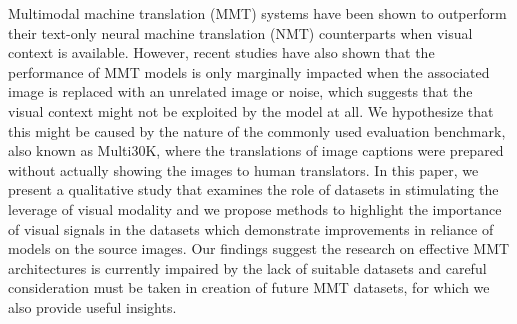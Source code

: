 Multimodal machine translation (MMT) systems have been shown to outperform their text-only neural machine translation (NMT) counterparts when visual context is available. However, recent studies have also shown that the performance of MMT models is only marginally impacted when the associated image is replaced with an unrelated image or noise, which suggests that the visual context might not be exploited by the model at all. We hypothesize that this might be caused by the nature of the commonly used evaluation benchmark, also known as Multi30K, where the translations of image captions were prepared without actually showing the images to human translators. In this paper, we present a qualitative study that examines the role of datasets in stimulating the leverage of visual modality and we propose methods to highlight the importance of visual signals in the datasets which demonstrate improvements in reliance of models on the source images. Our findings suggest the research on effective MMT architectures is currently impaired by the lack of suitable datasets and careful consideration must be taken in creation of future MMT datasets, for which we also provide useful insights.
